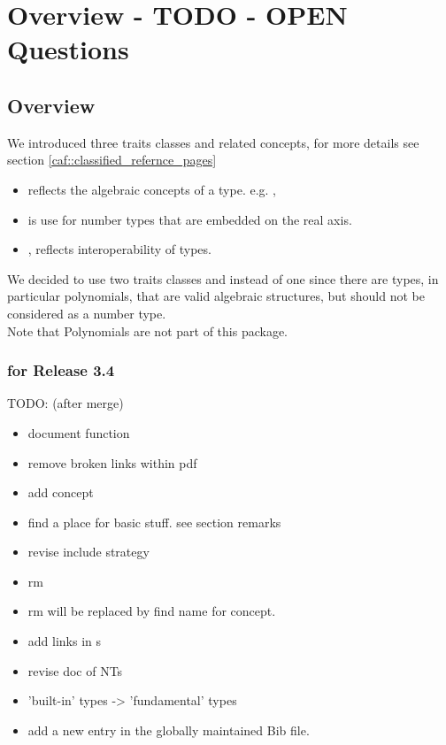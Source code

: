 \section{Overview - TODO - OPEN Questions}

\subsection{Overview}

We introduced three traits classes and related concepts, for more details see 
section \ref{caf::classified_refernce_pages}
\begin{itemize}
\item {} reflects the algebraic concepts of a 
      type. e.g. , 
\item {} is use for number types that are embedded on 
      the real axis. 
\item {}, reflects interoperability of types. 
\end{itemize}

We decided to use two traits classes  
and  instead of one  since there are 
types, in particular polynomials, that are valid algebraic structures, 
but should not be considered as a number type.\\
Note that Polynomials are not part of this package. 

\subsubsection{for Release 3.4}

TODO: (after merge) 
\begin{itemize}
\item document function 
\item remove broken links within pdf
\item add concept 
\item find a place for basic stuff. see section remarks
\item revise include strategy 
\item rm 
\item rm   will be replaced by 
      find name for concept.   
\item add links in s
\item revise doc of NTs
\item 'built-in' types -> 'fundamental' types 
\item add a new entry in the globally maintained Bib file.
\end{itemize}

